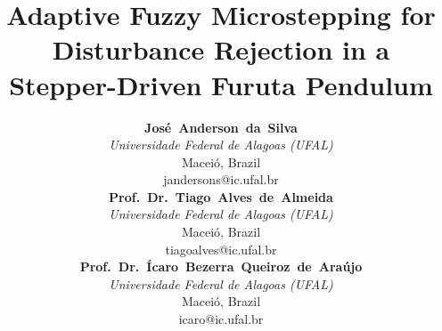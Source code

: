 \documentclass[conference]{IEEEtran}
\begin{document}
\title{Adaptive Fuzzy Microstepping for Disturbance Rejection in a Stepper-Driven Furuta Pendulum}

\author{%
\begin{minipage}[t]{0.26\textwidth}\centering
{\small\bfseries\mbox{Jos\'{e} Anderson da Silva}\par}
{\footnotesize
\textit{Universidade Federal de Alagoas (UFAL)}\par
Macei\'{o}, Brazil\par
jandersons@ic.ufal.br\par}
\end{minipage}\hfill
\begin{minipage}[t]{0.32\textwidth}\centering
{\small\bfseries\mbox{Prof. Dr. Tiago Alves de Almeida}\par}
{\footnotesize
\textit{Universidade Federal de Alagoas (UFAL)}\par
Macei\'{o}, Brazil\par
tiagoalves@ic.ufal.br\par}
\end{minipage}\hfill
\begin{minipage}[t]{0.40\textwidth}\centering
{\small\bfseries\mbox{Prof. Dr. \'{I}caro Bezerra Queiroz de Ara\'{u}jo}\par}
{\footnotesize
\textit{Universidade Federal de Alagoas (UFAL)}\par
Macei\'{o}, Brazil\par
icaro@ic.ufal.br\par}
\end{minipage}%
}

\maketitle
\end{document}
